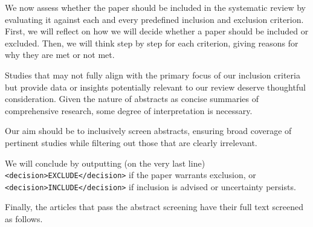 \begin{tcolorbox}
\begin{tcolorbox}[
    enhanced,
    colback=gray!5,
    colframe=gray!20,
    boxrule=0pt,
    leftrule=3pt,
    arc=0pt,
    left=6pt, right=6pt, top=4pt, bottom=4pt
]
\vspace{4pt}
{\small
We now assess whether the paper should be included in the systematic review by evaluating it against each and every predefined inclusion and exclusion criterion. First, we will reflect on how we will decide whether a paper should be included or excluded. Then, we will think step by step for each criterion, giving reasons for why they are met or not met.

\vspace{4pt}
Studies that may not fully align with the primary focus of our inclusion criteria but provide data or insights potentially relevant to our review deserve thoughtful consideration. Given the nature of abstracts as concise summaries of comprehensive research, some degree of interpretation is necessary.

\vspace{4pt}
Our aim should be to inclusively screen abstracts, ensuring broad coverage of pertinent studies while filtering out those that are clearly irrelevant.

\vspace{4pt}
We will conclude by outputting (on the very last line) \texttt{<decision>EXCLUDE</decision>} if the paper warrants exclusion, or \texttt{<decision>INCLUDE</decision>} if inclusion is advised or uncertainty persists.
}
\end{tcolorbox}

\end{tcolorbox}


\newpage
Finally, the articles that pass the abstract screening have their full text screened as follows.

